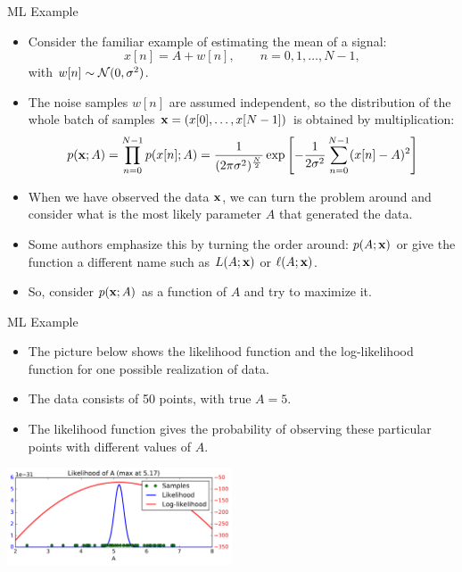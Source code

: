 \documentclass[10pt, aspectratio=169]{beamer} %
\newcommand{\x}{{\bf x}}
\begin{document}
\begin{frame}[allowframebreaks=0.8]
{ML Example}

\begin{itemize}
\item Consider the familiar example of estimating the mean of a signal:
\[
x[n] = A + w[n],\qquad n=0,1,\ldots, N-1,
\]
with $w[n]\sim {\cal N}(0, \sigma^2)$.
\item The noise samples $w[n]$ are assumed independent, so the distribution
of the whole batch of samples $\x = (x[0],\ldots, x[N-1])$ is obtained by multiplication:
\[
p({\x};A) = \prod_{n = 0}^{N-1} p(x[n]; A) = \frac{1}{(2 \pi \sigma^2)^{\frac{N}{2}}} \exp\left[-
  \frac{1}{2\sigma^2} \sum_{n=0}^{N-1} (x[n]-A)^2\right]
\]
\item When we have observed the data $\x$, we can turn the problem
  around and consider what is the most likely parameter $A$ that
  generated the data.
\item Some authors emphasize this by turning the order around:
  $p(A;\x)$ or give the function a different name such as $L(A; \x)$
  or $\ell(A;\x)$.
\item So, consider $p(\x;A)$ as a function of $A$ and try to maximize
  it.
\end{itemize}
\end{frame}

\begin{frame}[allowframebreaks=0.8]
{ML Example}

\begin{itemize}
\item  The picture below shows the likelihood function and the
  log-likelihood function for one possible realization of data.
\item The data consists of 50 points, with true $A=5$. 
\item The likelihood function gives the
  probability of observing these particular points with different
  values of $A$.
\end{itemize}
\centerline{\includegraphics[width=0.5\textwidth]{PDF_A_LL_full.pdf}}
\end{frame}
\end{document}
